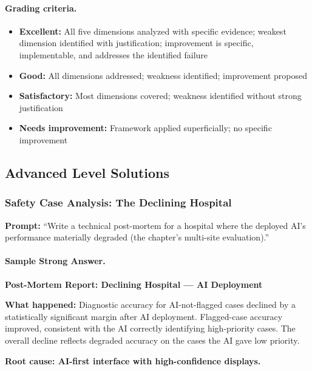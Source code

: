 \paragraph{Grading criteria.}
\begin{itemize}
    \item \textbf{Excellent:} All five dimensions analyzed with specific evidence; weakest dimension identified with justification; improvement is specific, implementable, and addresses the identified failure
    \item \textbf{Good:} All dimensions addressed; weakness identified; improvement proposed
    \item \textbf{Satisfactory:} Most dimensions covered; weakness identified without strong justification
    \item \textbf{Needs improvement:} Framework applied superficially; no specific improvement
\end{itemize}

\subsection{Advanced Level Solutions}

\subsubsection{Safety Case Analysis: The Declining Hospital}

\textbf{Prompt:} ``Write a technical post-mortem for a hospital where the deployed AI's performance materially degraded (the chapter's multi-site evaluation).''

\paragraph{Sample Strong Answer.}

\textbf{Post-Mortem Report: Declining Hospital --- AI Deployment}

\textbf{What happened:} Diagnostic accuracy for AI-not-flagged cases declined by a statistically significant margin after AI deployment. Flagged-case accuracy improved, consistent with the AI correctly identifying high-priority cases. The overall decline reflects degraded accuracy on the cases the AI gave low priority.

\textbf{Root cause: AI-first interface with high-confidence displays.}

